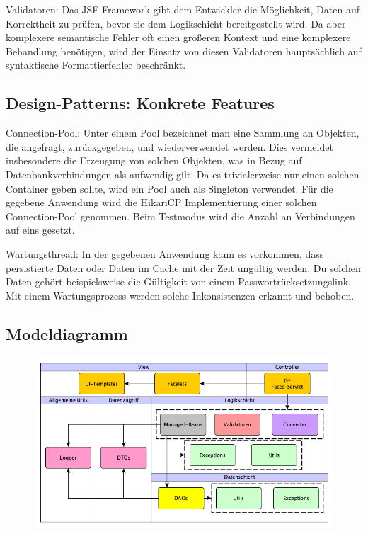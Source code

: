 \documentclass{article}
\begin{document}
Validatoren: Das JSF-Framework gibt dem Entwickler die Möglichkeit, Daten auf Korrektheit zu prüfen, bevor sie dem Logikschicht bereitgestellt wird. Da aber komplexere semantische Fehler oft einen größeren Kontext und eine komplexere Behandlung benötigen, wird der Einsatz von diesen Validatoren hauptsächlich auf syntaktische Formattierfehler beschränkt.

\subsection{Design-Patterns: Konkrete Features}

Connection-Pool: Unter einem Pool bezeichnet man eine Sammlung an Objekten, die angefragt, zurückgegeben, und wiederverwendet werden. Dies vermeidet insbesondere die Erzeugung von solchen Objekten, was in Bezug auf Datenbankverbindungen als aufwendig gilt. Da es trivialerweise nur einen solchen Container geben sollte, wird ein Pool auch als Singleton verwendet. Für die gegebene Anwendung wird die HikariCP Implementierung einer solchen Connection-Pool genommen. Beim Testmodus wird die Anzahl an Verbindungen auf eins gesetzt. \vspace{0.5em}

Wartungsthread: In der gegebenen Anwendung kann es vorkommen, dass persistierte Daten oder Daten im Cache mit der Zeit ungültig werden. Du solchen Daten gehört beispielsweise die Gültigkeit von einem Passwortrücksetzungslink. Mit einem Wartungsprozess werden solche Inkonsistenzen erkannt und behoben.

\subsection{Modeldiagramm}

\begin{figure}[H]
	\centering
	\includegraphics[width = 50em]{Modeldiagramm}
\end{figure}
\end{document}
